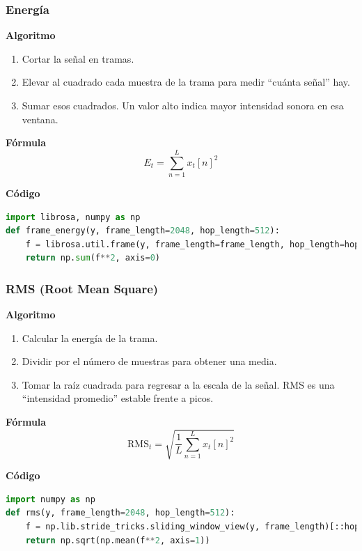 \subsubsection{Energía}
\textbf{Algoritmo} \parencite{giannakopoulos2014intro, muller2015fmp}
\begin{enumerate}
  \item Cortar la señal en tramas.
  \item Elevar al cuadrado cada muestra de la trama para medir “cuánta señal” hay.
  \item Sumar esos cuadrados. Un valor alto indica mayor intensidad sonora en esa ventana.
\end{enumerate}

\textbf{Fórmula}
\[
  E_t = \sum_{n=1}^{L} x_t[n]^2
\]

\textbf{Código}
\begin{lstlisting}[language=Python, label={lst:energy_code}, caption={Energía por tramas}]
import librosa, numpy as np
def frame_energy(y, frame_length=2048, hop_length=512):
    f = librosa.util.frame(y, frame_length=frame_length, hop_length=hop_length)
    return np.sum(f**2, axis=0)
\end{lstlisting}

\subsubsection{RMS (Root Mean Square)}
\textbf{Algoritmo} \parencite{oppenheim2010dsp, muller2015fmp}
\begin{enumerate}
  \item Calcular la energía de la trama.
  \item Dividir por el número de muestras para obtener una media.
  \item Tomar la raíz cuadrada para regresar a la escala de la señal. RMS es una “intensidad promedio” estable frente a picos.
\end{enumerate}

\textbf{Fórmula}
\[
  \text{RMS}_t=\sqrt{\frac{1}{L}\sum_{n=1}^{L}x_t[n]^2}
\]

\textbf{Código}
\begin{lstlisting}[language=Python, label={lst:rms_code}, caption={RMS por tramas}]
import numpy as np
def rms(y, frame_length=2048, hop_length=512):
    f = np.lib.stride_tricks.sliding_window_view(y, frame_length)[::hop_length]
    return np.sqrt(np.mean(f**2, axis=1))
\end{lstlisting}

